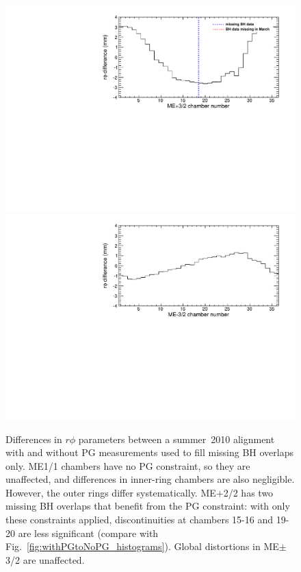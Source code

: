 \documentclass[12pt]{article}
\begin{document}
\begin{figure}
\begin{center}
\includegraphics[width=0.45\linewidth]{withPGtoPGholes_mep32.pdf}
\includegraphics[width=0.45\linewidth]{withPGtoPGholes_mem32.pdf}
\end{center}

\caption{Differences in $r\phi$ parameters between a summer~2010
  alignment with and without PG measurements used to fill missing BH
  overlaps only.  ME1/1 chambers have no PG constraint, so they are
  unaffected, and differences in inner-ring chambers are also
  negligible.  However, the outer rings differ systematically.
  ME$+$2/2 has two missing BH overlaps that benefit from the PG
  constraint: with only these constraints applied, discontinuities at
  chambers 15-16 and 19-20 are less significant (compare with
  Fig.~\ref{fig:withPGtoNoPG_histograms}).  Global distortions in
  ME$\pm$3/2 are unaffected. \label{fig:withPGtoPGholes_histograms}}
\end{figure}
\end{document}
